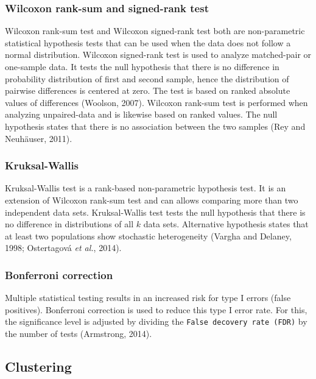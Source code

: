 \documentclass[
  parskip,
  oneside]{scrreprt}
\begin{document}
\hypertarget{wilcoxon-rank-sum-and-signed-rank-test}{%
\subsubsection{Wilcoxon rank-sum and signed-rank
test}\label{wilcoxon-rank-sum-and-signed-rank-test}}

Wilcoxon rank-sum test and Wilcoxon signed-rank test both are
non-parametric statistical hypothesis tests that can be used when the
data does not follow a normal distribution. Wilcoxon signed-rank test is
used to analyze matched-pair or one-sample data. It tests the null
hypothesis that there is no difference in probability distribution of
first and second sample, hence the distribution of pairwise differences
is centered at zero. The test is based on ranked absolute values of
differences (Woolson, 2007). Wilcoxon rank-sum test is performed when
analyzing unpaired-data and is likewise based on ranked values. The null
hypothesis states that there is no association between the two samples
(Rey and Neuhäuser, 2011).

\hypertarget{kruksal-wallis}{%
\subsubsection{Kruksal-Wallis}\label{kruksal-wallis}}

Kruksal-Wallis test is a rank-based non-parametric hypothesis test. It
is an extension of Wilcoxon rank-sum test and can allows comparing more
than two independent data sets. Kruksal-Wallis test tests the null
hypothesis that there is no difference in distributions of all \(k\)
data sets. Alternative hypothesis states that at least two populations
show stochastic heterogeneity (Vargha and Delaney, 1998; Ostertagová
\emph{et al.}, 2014).

\hypertarget{bonferroni-correction}{%
\subsubsection{Bonferroni correction}\label{bonferroni-correction}}

Multiple statistical testing results in an increased risk for type I
errors (false positives). Bonferroni correction is used to reduce this
type I error rate. For this, the significance level is adjusted by
dividing the \texttt{False\ decovery\ rate\ (FDR)} by the number of
tests (Armstrong, 2014).

\hypertarget{clustering}{%
\subsection{Clustering}\label{clustering}}
\end{document}
